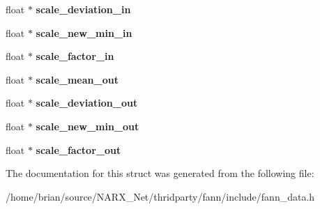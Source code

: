 \begin{DoxyCompactItemize}
\item 
\hypertarget{structfann_adc1d6b12024fdb5bd64d20bb0c741b2e}{float $\ast$ {\bfseries scale\-\_\-deviation\-\_\-in}}\label{structfann_adc1d6b12024fdb5bd64d20bb0c741b2e}

\item 
\hypertarget{structfann_a1820d62e90fe41c851e1fb239ce24d10}{float $\ast$ {\bfseries scale\-\_\-new\-\_\-min\-\_\-in}}\label{structfann_a1820d62e90fe41c851e1fb239ce24d10}

\item 
\hypertarget{structfann_a90d972d0c9fab7eb6a30e86ed8bbf26a}{float $\ast$ {\bfseries scale\-\_\-factor\-\_\-in}}\label{structfann_a90d972d0c9fab7eb6a30e86ed8bbf26a}

\item 
\hypertarget{structfann_a9d5b32849d08be1833ffde44c7f50f90}{float $\ast$ {\bfseries scale\-\_\-mean\-\_\-out}}\label{structfann_a9d5b32849d08be1833ffde44c7f50f90}

\item 
\hypertarget{structfann_a8d3c5f752c25dc8757ad44d91de879f3}{float $\ast$ {\bfseries scale\-\_\-deviation\-\_\-out}}\label{structfann_a8d3c5f752c25dc8757ad44d91de879f3}

\item 
\hypertarget{structfann_a9c937c4fac3b7fbe3e66207208514a86}{float $\ast$ {\bfseries scale\-\_\-new\-\_\-min\-\_\-out}}\label{structfann_a9c937c4fac3b7fbe3e66207208514a86}

\item 
\hypertarget{structfann_a2c874874efa9800e6f8a4e37d230f85e}{float $\ast$ {\bfseries scale\-\_\-factor\-\_\-out}}\label{structfann_a2c874874efa9800e6f8a4e37d230f85e}

\end{DoxyCompactItemize}


The documentation for this struct was generated from the following file\-:\begin{DoxyCompactItemize}
\item 
/home/brian/source/\-N\-A\-R\-X\-\_\-\-Net/thridparty/fann/include/fann\-\_\-data.\-h\end{DoxyCompactItemize}
